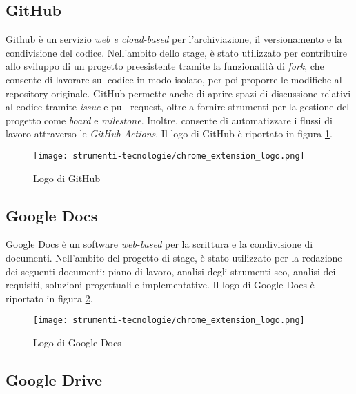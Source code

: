 \subsection*{GitHub}

\par Github è un servizio \textit{web e cloud-based} per l'archiviazione, il versionamento e la condivisione del codice. Nell’ambito dello stage, è stato utilizzato per contribuire allo sviluppo di un progetto preesistente tramite la funzionalità di \textit{fork}, che consente di lavorare sul codice in modo isolato, per poi proporre le modifiche al \gls{repository} originale. GitHub permette anche di aprire spazi di discussione relativi al codice tramite \textit{issue} e \gls{pull request}, oltre a fornire strumenti per la gestione del progetto come \textit{board} e \textit{milestone}. Inoltre, consente di automatizzare i flussi di lavoro attraverso le \textit{GitHub Actions}. Il logo di GitHub è riportato in figura \ref{fig:logo_github}.

\begin{figure}[H]
  \centering 
  \texttt{[image: strumenti-tecnologie/chrome\_extension\_logo.png]} 
  \caption{Logo di GitHub}
  \label{fig:logo_github}
\end{figure}

\subsection*{Google Docs}

\par Google Docs è un software \textit{web-based} per la scrittura e la condivisione di documenti. Nell’ambito del progetto di stage, è stato utilizzato per la redazione dei seguenti documenti: piano di lavoro, analisi degli strumenti \gls{seo}, analisi dei \gls{requisiti}, soluzioni progettuali e implementative. Il logo di Google Docs è riportato in figura \ref{fig:logo_google_docs}.

\begin{figure}[H]
  \centering 
  \texttt{[image: strumenti-tecnologie/chrome\_extension\_logo.png]} 
  \caption{Logo di Google Docs}
  \label{fig:logo_google_docs}
\end{figure}

\subsection*{Google Drive}


